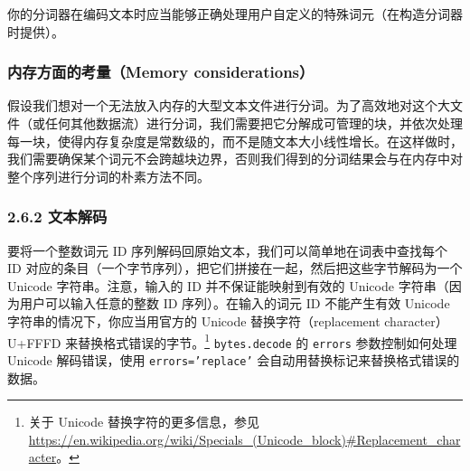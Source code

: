 你的分词器在编码文本时应当能够正确处理用户自定义的特殊词元（在构造分词器时提供）。

\subsubsection*{内存方面的考量（Memory considerations）}

假设我们想对一个无法放入内存的大型文本文件进行分词。为了高效地对这个大文件（或任何其他数据流）进行分词，我们需要把它分解成可管理的块，并依次处理每一块，使得内存复杂度是常数级的，而不是随文本大小线性增长。在这样做时，我们需要确保某个词元不会跨越块边界，否则我们得到的分词结果会与在内存中对整个序列进行分词的朴素方法不同。

\subsubsection*{2.6.2 文本解码}

要将一个整数词元 ID 序列解码回原始文本，我们可以简单地在词表中查找每个 ID 对应的条目（一个字节序列），把它们拼接在一起，然后把这些字节解码为一个 Unicode 字符串。注意，输入的 ID 并不保证能映射到有效的 Unicode 字符串（因为用户可以输入任意的整数 ID 序列）。在输入的词元 ID 不能产生有效 Unicode 字符串的情况下，你应当用官方的 Unicode 替换字符（replacement character）U+FFFD 来替换格式错误的字节。\footnote{关于 Unicode 替换字符的更多信息，参见 \url{https://en.wikipedia.org/wiki/Specials_(Unicode_block)\#Replacement_character}。} \texttt{bytes.decode} 的 \texttt{errors} 参数控制如何处理 Unicode 解码错误，使用 \texttt{errors='replace'} 会自动用替换标记来替换格式错误的数据。

